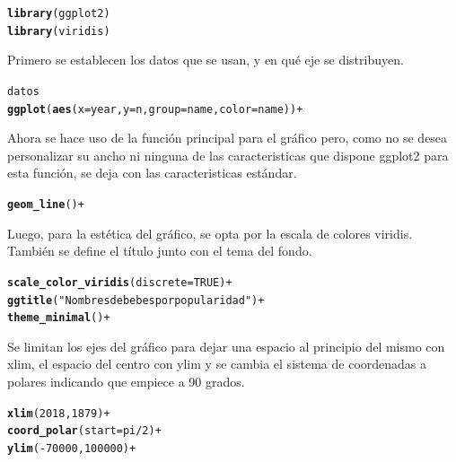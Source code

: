 \documentclass{article}\usepackage[]{graphicx}\usepackage[]{color}
\makeatletter
\newcommand{\hlstr}[1]{\textcolor[rgb]{0.192,0.494,0.8}{#1}}%
\newcommand{\hlstd}[1]{\textcolor[rgb]{0.345,0.345,0.345}{#1}}%
\newcommand{\hlkwd}[1]{\textcolor[rgb]{0.737,0.353,0.396}{\textbf{#1}}}%
\newenvironment{kframe}{%
 \def\at@end@of@kframe{}%
 \ifinner\ifhmode%
  \def\at@end@of@kframe{\end{minipage}}%
  \begin{minipage}{\columnwidth}%
 \fi\fi%
 \def\FrameCommand##1{\hskip\@totalleftmargin \hskip-\fboxsep
 \colorbox{shadecolor}{##1}\hskip-\fboxsep
     \hskip-\linewidth \hskip-\@totalleftmargin \hskip\columnwidth}%
 \MakeFramed {\advance\hsize-\width
   \@totalleftmargin\z@ \linewidth\hsize
   \@setminipage}}%
 {\par\unskip\endMakeFramed%
 \at@end@of@kframe}
\newenvironment{knitrout}{}{} %
\makeatother
\begin{document}
\begin{knitrout}
\color{fgcolor}\begin{kframe}
\begin{alltt}
\hlkwd{library}\hlstd{(ggplot2)}
\hlkwd{library}\hlstd{(viridis)}
\end{alltt}
\end{kframe}
\end{knitrout}
Primero se establecen los datos que se usan, y en qu\'e eje se distribuyen.
\begin{knitrout}
\color{fgcolor}\begin{kframe}
\begin{alltt}
datos %
  \hlkwd{ggplot}(\hlkwd{aes}(x=year, y=n, group=name, color=name)) +
\end{alltt}
\end{kframe}
\end{knitrout}
Ahora se hace uso de la funci\'on principal para el gr\'afico pero, como no se desea personalizar su ancho ni ninguna de las caracteristicas que dispone ggplot2 para esta funci\'on, se deja con las caracteristicas est\'andar.
\begin{knitrout}
\color{fgcolor}\begin{kframe}
\begin{alltt}
  \hlkwd{geom_line}() +
\end{alltt}
\end{kframe}
\end{knitrout}
Luego, para la est\'etica del gr\'afico, se opta por la escala de colores viridis. Tambi\'en se define el t\'itulo junto con el tema del fondo.
\begin{knitrout}
\color{fgcolor}\begin{kframe}
\begin{alltt}
  \hlkwd{scale_color_viridis}(discrete = TRUE) +
  \hlkwd{ggtitle}(\hlstr{"Nombres de bebes por popularidad"}) +
  \hlkwd{theme_minimal}() +
\end{alltt}
\end{kframe}
\end{knitrout}
\clearpage
Se limitan los ejes del gr\'afico para dejar una espacio al principio del mismo con xlim, el espacio del centro con ylim y se cambia el sistema de coordenadas a polares indicando que empiece a 90 grados.
\begin{knitrout}
\color{fgcolor}\begin{kframe}
\begin{alltt}
  \hlkwd{xlim}(2018, 1879) +
  \hlkwd{coord_polar}(start = pi/2) +
  \hlkwd{ylim}(-70000,100000)+
\end{alltt}
\end{kframe}
\end{knitrout}
\end{document}
